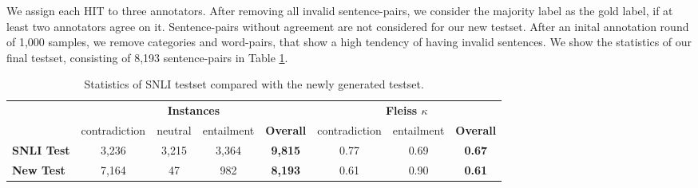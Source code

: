 \noindent
We assign each \ac{HIT} to three annotators. After removing all invalid sentence-pairs, we consider the majority label as the gold label, if at least two annotators agree on it. Sentence-pairs without agreement are not considered for our new testset. After an inital annotation round of 1,000 samples, we remove categories and word-pairs, that show a high tendency of having invalid sentences. We show the statistics of our final testset, consisting of 8,193 sentence-pairs in Table \ref{tab:newtest_stats}.
\begin{table}[tph!]
\centering
\begin{tabular}{l|cccc|ccc}
& \multicolumn{4}{c}{\textbf{Instances}} & \multicolumn{3}{c}{\textbf{Fleiss $\kappa$}} \\
& contradiction & neutral & entailment & \textbf{Overall} & contradiction & entailment & \textbf{Overall} \\
\toprule
\textbf{SNLI Test}& 3,236 & 3,215 & 3,364 & \textbf{9,815} & 0.77 & 0.69 & \textbf{0.67} \\
\textbf{New Test}& 7,164 & 47 & 982 & \textbf{8,193} & 0.61 & 0.90 & \textbf{0.61} \\
\bottomrule
\end{tabular}
	\caption{Statistics of \ac{SNLI} testset compared with the newly generated testset.}
	\label{tab:newtest_stats}
\end{table}
